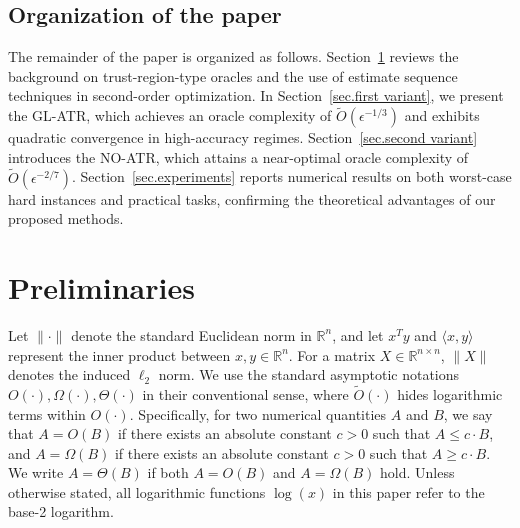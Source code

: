 \documentclass{mcom-l}
\numberwithin{equation}{section}
\begin{document}
\subsection{Organization of the paper}
The remainder of the paper is organized as follows. Section~\ref{sec.priliminary} reviews the background on trust-region-type oracles and the use of estimate sequence techniques in second-order optimization. In Section~\ref{sec.first variant}, we present the GL-ATR, which achieves an oracle complexity of $\tilde O(\epsilon^{-1/3})$ and exhibits quadratic convergence in high-accuracy regimes. Section~\ref{sec.second variant} introduces the NO-ATR, which attains a near-optimal oracle complexity of $\tilde O(\epsilon^{-2/7})$. Section~\ref{sec.experiments} reports numerical results on both worst-case hard instances and practical tasks, confirming the theoretical advantages of our proposed methods.
\section{Preliminaries}
\label{sec.priliminary}
Let $\|\cdot\|$ denote the standard Euclidean norm in $\mathbb{R}^n$, and let $x^T y$ and $\langle x,y\rangle$ represent the inner product between $x, y \in \mathbb{R}^n$. For a matrix $X \in \mathbb{R}^{n \times n}$, $\|X\|$ denotes the induced $\ell_2$ norm. We use the standard asymptotic notations $O(\cdot), \Omega(\cdot), \Theta(\cdot)$ in their conventional sense, where $\tilde{O}(\cdot)$ hides logarithmic terms within $O(\cdot)$. Specifically, for two numerical quantities $A$ and $B$, we say that $A = O(B)$ if there exists an absolute constant $c > 0$ such that $A \leq c \cdot B$, and $A = \Omega(B)$ if there exists an absolute constant $c > 0$ such that $A \geq c \cdot B$. We write $A = \Theta(B)$ if both $A = O(B)$ and $A = \Omega(B)$ hold. Unless otherwise stated, all logarithmic functions $\log(x)$ in this paper refer to the base-2 logarithm.
\end{document}
